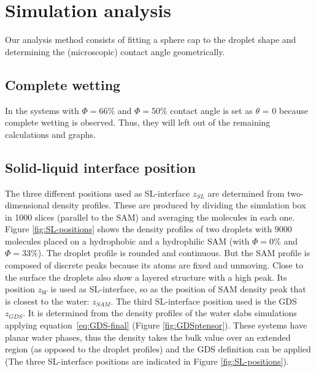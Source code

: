 \section{Simulation analysis}

Our analysis method consists of fitting a sphere cap to the droplet
shape and determining the (microscopic) contact angle geometrically.

\subsection{Complete wetting}

In the systems with $\Phi=66\%$ and $\Phi=50\%$ contact angle is
set as $\theta$ = 0 because complete wetting is observed. Thus, they
will left out of the remaining calculations and graphs.

\subsection{Solid-liquid interface position}

The three different positions used as SL-interface $z_{SL}$ are determined
from two-dimensional density profiles. These are produced by dividing
the simulation box in 1000 slices (parallel to the SAM) and averaging
the molecules in each one. Figure \ref{fig:SL-positions} shows the
density profiles of two droplets with 9000 molecules placed on a hydrophobic
and a hydrophilic SAM (with $\Phi=0\%$ and $\Phi=33\%$). The droplet
profile is rounded and continuous. But the SAM profile is composed
of discrete peaks because its atoms are fixed and unmoving. Close
to the surface the droplets also show a layered structure with a high
peak. Its position $z_{W}$ is used as SL-interface, so as the position
of SAM density peak that is closest to the water: $z_{SAM}$. The
third SL-interface position used is the GDS $z_{GDS}$. It is determined
from the density profiles of the water slabs simulations applying
equation~\ref{eq:GDS-final} (Figure \ref{fig:GDSptensor}). These
systems have planar water phases, thus the density takes the bulk
value over an extended region (as opposed to the droplet profiles)
and the GDS definition can be applied (The three SL-interface positions
are indicated in Figure \ref{fig:SL-positions}).